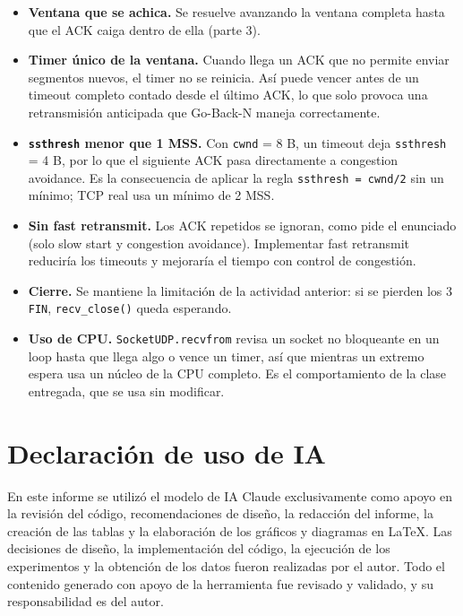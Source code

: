 \documentclass[11pt,letterpaper]{article}
\begin{document}
\begin{itemize}
  \item \textbf{Ventana que se achica.} Se resuelve avanzando la ventana completa hasta
        que el ACK caiga dentro de ella (parte 3).
  \item \textbf{Timer único de la ventana.} Cuando llega un ACK que no permite enviar
        segmentos nuevos, el timer no se reinicia. Así puede vencer antes de un timeout
        completo contado desde el último ACK, lo que solo provoca una retransmisión
        anticipada que Go-Back-N maneja correctamente.
  \item \textbf{\texttt{ssthresh} menor que 1 MSS.} Con \texttt{cwnd} = 8 B, un timeout
        deja \texttt{ssthresh} = 4 B, por lo que el siguiente ACK pasa directamente a
        congestion avoidance. Es la consecuencia de aplicar la regla
        \texttt{ssthresh = cwnd/2} sin un mínimo; TCP real usa un mínimo de 2 MSS.
  \item \textbf{Sin fast retransmit.} Los ACK repetidos se ignoran, como pide el
        enunciado (solo slow start y congestion avoidance). Implementar fast retransmit
        reduciría los timeouts y mejoraría el tiempo con control de congestión.
  \item \textbf{Cierre.} Se mantiene la limitación de la actividad anterior: si se pierden
        los 3 \texttt{FIN}, \texttt{recv\_close()} queda esperando.
  \item \textbf{Uso de CPU.} \texttt{SocketUDP.recvfrom} revisa un socket no bloqueante
        en un loop hasta que llega algo o vence un timer, así que mientras un extremo
        espera usa un núcleo de la CPU completo. Es el comportamiento de la clase
        entregada, que se usa sin modificar.
\end{itemize}

\section*{Declaración de uso de IA}

En este informe se utilizó el modelo de IA Claude exclusivamente como apoyo en la
revisión del código, recomendaciones de diseño, la redacción del informe, la creación de
las tablas y la elaboración de los gráficos y diagramas en \LaTeX{}. Las decisiones de
diseño, la implementación del código, la ejecución de los experimentos y la obtención de
los datos fueron realizadas por el autor. Todo el contenido generado con apoyo de la
herramienta fue revisado y validado, y su responsabilidad es del autor.
\end{document}
